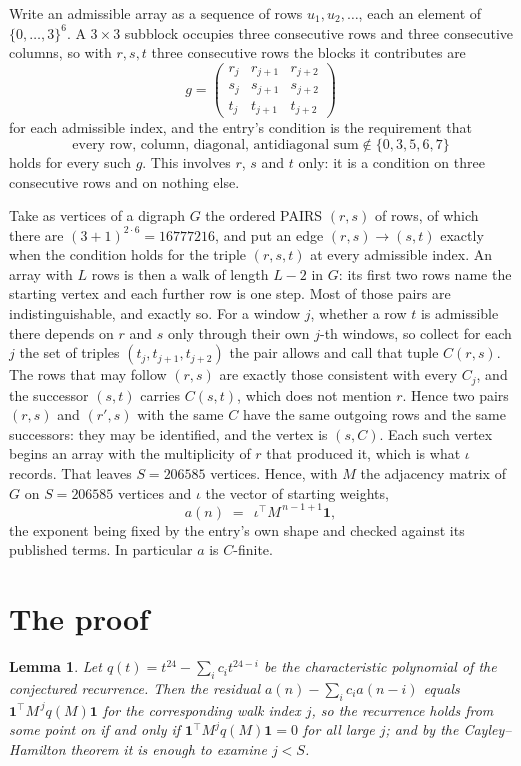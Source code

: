 \documentclass[11pt,a4paper]{article}
\theoremstyle{plain}
\newtheorem{lemma}[theorem]{Lemma}
\theoremstyle{definition}
\begin{document}
Write an admissible array as a sequence of rows $u_1,u_2,\dots$, each an element of
$\{0,\dots,3\}^{6}$. A $3\times3$ subblock occupies three consecutive rows and
three consecutive columns, so with $r,s,t$ three consecutive rows the blocks it
contributes are
\[
g=\begin{pmatrix}r_j&r_{j+1}&r_{j+2}\\ s_j&s_{j+1}&s_{j+2}\\ t_j&t_{j+1}&t_{j+2}\end{pmatrix}
\]
for each admissible index, and the entry's condition is the requirement that
\[
\text{every row, column, diagonal, antidiagonal sum} \notin \{0,3,5,6,7\}
\]
holds for every such $g$. This involves $r$, $s$ and $t$ only: it is a condition on
three consecutive rows and on nothing else.

Take as vertices of a digraph $G$ the ordered PAIRS $(r,s)$ of rows, of which there are
$(3+1)^{2\cdot6}=16777216$, and put an edge $(r,s)\to(s,t)$ exactly when the condition
holds for the triple $(r,s,t)$ at every admissible index. An array with $L$ rows is then a
walk of length $L-2$ in $G$: its first two rows name the starting vertex and each further
row is one step. Most of those pairs are indistinguishable, and exactly so. For a window $j$, whether a row $t$ is admissible there depends on $r$ and $s$ only through their own $j$-th windows, so collect for each $j$ the set of triples $(t_j,t_{j+1},t_{j+2})$ the pair allows and call that tuple $C(r,s)$. The rows that may follow $(r,s)$ are exactly those consistent with every $C_j$, and the successor $(s,t)$ carries $C(s,t)$, which does not mention $r$. Hence two pairs $(r,s)$ and $(r',s)$ with the same $C$ have the same outgoing rows and the same successors: they may be identified, and the vertex is $(s,C)$. Each such vertex begins an array with the multiplicity of $r$ that produced it, which is what $\iota$ records. That leaves $S=206585$ vertices. Hence, with $M$ the adjacency matrix of $G$ on $S=206585$ vertices and
$\iota$ the vector of starting weights,
\[
a(n)\;=\;\,\iota^{\!\top}M^{\,n-1+1}\mathbf{1},
\]
the exponent being fixed by the entry's own shape and checked against its published terms.
In particular $a$ is $C$-finite.

\section{The proof}

\begin{lemma}\label{lem:crit}
Let $q(t)=t^{24}-\sum_i c_it^{24-i}$ be the characteristic polynomial of the
conjectured recurrence. Then the residual $a(n)-\sum_ic_ia(n-i)$ equals
$\mathbf{1}^{\!\top}M^{\,j}q(M)\mathbf{1}$ for the corresponding walk index
$j$, so the recurrence holds from some point on if and only if
$\mathbf{1}^{\!\top}M^{j}q(M)\mathbf{1}=0$ for all large $j$; and by the
Cayley--Hamilton theorem it is enough to examine $j<S$.
\end{lemma}
\end{document}
